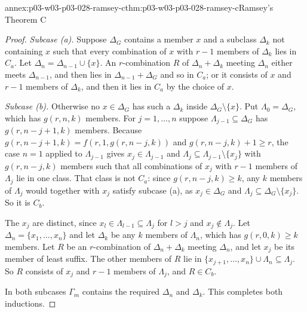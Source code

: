 \begin{annexitem}{annex:p03-w03-p03-028-ramsey-c}{thm:p03-w03-p03-028-ramsey-c}{Ramsey's Theorem C}
\begin{proof}
\emph{Subcase (a).}  Suppose \(\Delta_G\) contains a member \(x\) and a
subclass \(\Delta_k\) not containing \(x\) such that every combination of
\(x\) with \(r-1\) members of \(\Delta_k\) lies in \(C_a\).  Let
\(\Delta_n=\Delta_{n-1}\cup\{x\}\).  An \(r\)-combination \(R\) of
\(\Delta_n+\Delta_k\) meeting \(\Delta_n\) either meets \(\Delta_{n-1}\),
and then lies in \(\Delta_{n-1}+\Delta_G\) and so in \(C_a\); or it consists
of \(x\) and \(r-1\) members of \(\Delta_k\), and then it lies in \(C_a\)
by the choice of \(x\).

\emph{Subcase (b).}  Otherwise no \(x\in\Delta_G\) has such a \(\Delta_k\)
inside \(\Delta_G\setminus\{x\}\).  Put \(\Lambda_0=\Delta_G\), which has
\(g(r,n,k)\) members.  For \(j=1,\ldots,n\) suppose \(\Lambda_{j-1}
\subseteq\Delta_G\) has \(g(r,n-j+1,k)\) members.  Because
\(g(r,n-j+1,k)=f(r,1,g(r,n-j,k))\) and \(g(r,n-j,k)+1\geq r\), the case
\(n=1\) applied to \(\Lambda_{j-1}\) gives \(x_j\in\Lambda_{j-1}\) and
\(\Lambda_j\subseteq\Lambda_{j-1}\setminus\{x_j\}\) with
\(g(r,n-j,k)\) members such that all combinations of \(x_j\) with
\(r-1\) members of \(\Lambda_j\) lie in one class.  That class is not
\(C_a\): since \(g(r,n-j,k)\geq k\), any \(k\) members of \(\Lambda_j\)
would together with \(x_j\) satisfy subcase (a), as \(x_j\in\Delta_G\) and
\(\Lambda_j\subseteq\Delta_G\setminus\{x_j\}\).  So it is \(C_b\).

The \(x_j\) are distinct, since \(x_l\in\Lambda_{l-1}\subseteq\Lambda_j\)
for \(l>j\) and \(x_j\notin\Lambda_j\).  Let
\(\Delta_n=\{x_1,\ldots,x_n\}\) and let \(\Delta_k\) be any \(k\) members of
\(\Lambda_n\), which has \(g(r,0,k)\geq k\) members.  Let \(R\) be an
\(r\)-combination of \(\Delta_n+\Delta_k\) meeting \(\Delta_n\), and let
\(x_j\) be its member of least suffix.  The other members of \(R\) lie in
\(\{x_{j+1},\ldots,x_n\}\cup\Lambda_n\subseteq\Lambda_j\).  So \(R\) consists
of \(x_j\) and \(r-1\) members of \(\Lambda_j\), and \(R\in C_b\).

In both subcases \(\Gamma_m\) contains the required \(\Delta_n\) and
\(\Delta_k\).  This completes both inductions.
\end{proof}
\end{annexitem}

